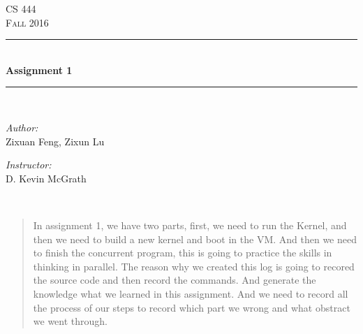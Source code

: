 \documentclass[letterpaper,10pt]{article}
\begin{document}
    \begin{titlepage}
    \newcommand{\HRule}{\rule{\linewidth}{0.5mm}}
    \center 
    \textsc{\Large CS 444}\\[0.5cm] 
    \textsc{\Large Fall 2016}\\[0.5cm] 
    \HRule \\[0.4cm]
    { \huge \bfseries Assignment 1}\\[0.5cm] %
    \HRule \\[1.5cm]
    \begin{minipage}{0.4\textwidth}
        \begin{flushleft} \large
        \emph{Author:}\\
        Zixuan Feng, Zixun Lu
        \end{flushleft}
    \end{minipage}
    \begin{minipage}{0.4\textwidth}
        \begin{flushright} \large
        \emph{Instructor:} \\
        D. Kevin McGrath
        \end{flushright}
    \end{minipage}\\[2cm]
    \begin{abstract}

    \item In assignment 1, we have two parts, first, we need to run the Kernel, and then we need to build a new kernel and boot in the VM. And then we need to finish the concurrent program, this is going to practice the skills in thinking in parallel. The reason why we created this log is going to recored the source code and then record the commands. And generate the knowledge what we learned in this assignment. And we need to record all the process of our steps to record which part we wrong and what obstract we went through. 
    \end{abstract}
    \vfill 

    \end{titlepage}
    


\end{document}

